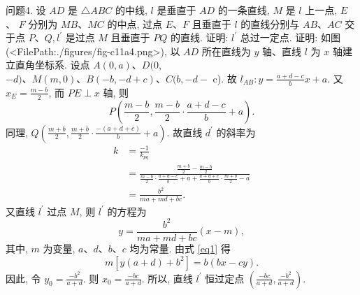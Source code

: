问题4. 设 $A D$ 是 $\triangle A B C$ 的中线, $l$ 是垂直于 $A D$ 的一条直线, $M$ 是 $l$ 上一点, $E$ 、 $F$ 分别为 $M B 、 M C$ 的中点, 过点 $E 、 F$ 且垂直于 $l$ 的直线分别与 $A B 、 A C$ 交于点 $P 、 Q, l^{\prime}$ 是过点 $M$ 且垂直于 $P Q$ 的直线.
证明: $l^{\prime}$ 总过一定点.
证明: 如图(<FilePath:./figures/fig-c11a4.png>), 以 $A D$ 所在直线为 $y$ 轴、直线 $l$ 为 $x$ 轴建立直角坐标系.
设点 $A(0, a) 、 D(0$, $-d) 、 M(m, 0) 、 B(-b,-d+c) 、 C(b,-d-$ c).
故 $l_{A B}: y=\frac{a+d-c}{b} x+a$.
又 $x_E=\frac{m-b}{2}$, 而 $P E \perp x$ 轴, 则
$$
P\left(\frac{m-b}{2}, \frac{m-b}{2} \cdot \frac{a+d-c}{b}+a\right) .
$$
同理, $Q\left(\frac{m+b}{2}, \frac{m+b}{2} \cdot \frac{-(a+d+c)}{b}+a\right)$.
故直线 $d^{\prime}$ 的斜率为
$$
\begin{aligned}
k & =\frac{-1}{k_{p q}} \\
& =\frac{\frac{m+b}{2}-\frac{m-b}{2}}{\frac{m-b}{2} \cdot \frac{a+d-c}{b}+a+\frac{a+d+c}{b} \cdot \frac{m+b}{2}-a} \\
& =\frac{b^2}{m a+m d+b c} .
\end{aligned}
$$
又直线 $l^{\prime}$ 过点 $M$, 则 $l^{\prime}$ 的方程为
$$
y=\frac{b^2}{m a+m d+b c}(x-m), \label{eq1}
$$
其中, $m$ 为变量, $a 、 d 、 b 、 c$ 均为常量.
由式 \ref{eq1} 得
$$
m\left[y(a+d)+b^2\right]=b(b x-c y) .
$$
因此, 令 $y_0=\frac{-b^2}{a+d}$. 则 $x_0=\frac{-b c}{a+d}$.
所以, 直线 $l^{\prime}$ 恒过定点 $\left(\frac{-b c}{a+d}, \frac{-b^2}{a+d}\right)$.



